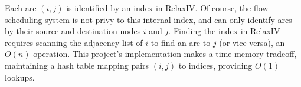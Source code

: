 Each arc $(i,j)$ is identified by an index in RelaxIV. Of course, the flow scheduling system is not privy to this internal index, and can only identify arcs by their source and destination nodes $i$ and $j$. Finding the index in RelaxIV requires scanning the adjacency list of $i$ to find an arc to $j$ (or vice-versa), an $O(n)$ operation. This project's implementation makes a time-memory tradeoff, maintaining a hash table mapping pairs $(i,j)$ to indices, providing $O(1)$ lookups\footnotemark.

%
%
%
%
%
%
%
%
%
%
%

